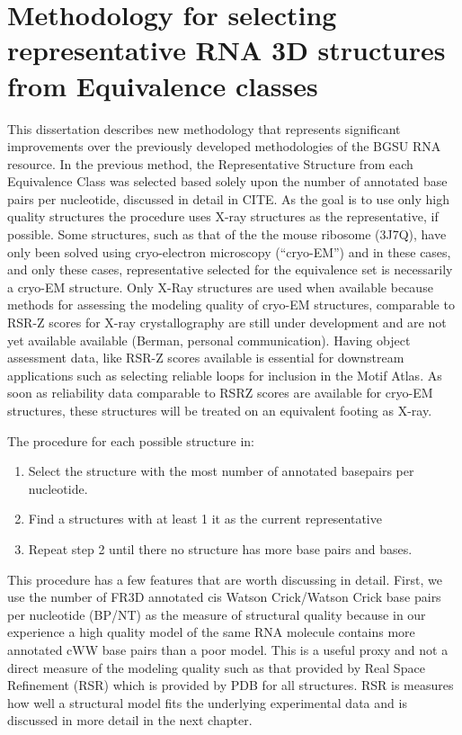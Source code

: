 \section{Methodology for selecting representative RNA 3D structures from
Equivalence classes}

This dissertation describes new methodology that represents significant
improvements over the previously developed methodologies of the BGSU RNA
resource. In the previous method, the Representative Structure from each
Equivalence Class was selected based solely upon the number of annotated base
pairs per nucleotide, discussed in detail in CITE. 
As the goal is to use only high quality structures the procedure uses X-ray
structures as the representative, if possible. Some structures, such as that of
the the mouse ribosome (3J7Q), have only been solved using cryo-electron
microscopy (“cryo-EM”) and in these cases, and only these cases, representative
selected for the equivalence set is necessarily a cryo-EM structure. Only X-Ray
structures are used when available because methods for assessing the modeling
quality of cryo-EM structures, comparable to RSR-Z scores for X-ray
crystallography are still under development and are not yet available available
(Berman, personal communication). Having object assessment data, like RSR-Z
scores available is essential for downstream applications such as selecting
reliable loops for inclusion in the Motif Atlas. As soon as reliability data
comparable to RSRZ scores are available for cryo-EM structures, these structures
will be treated on an equivalent footing as X-ray.

The procedure for each possible structure in:

\begin{enumerate}
  \item Select the structure with the most number of annotated basepairs per
    nucleotide.

  \item Find a structures with at least 1%
    it as the current representative

  \item Repeat step 2 until there no structure has more base pairs and bases.
\end{enumerate}

This procedure has a few features that are worth discussing in detail. First, we
use the number of FR3D annotated cis Watson Crick/Watson Crick base pairs per
nucleotide (BP/NT) as the measure of structural quality because in our
experience a high quality model of the same RNA molecule contains more annotated
cWW base pairs than a poor model. This is a useful proxy and not a direct
measure of the modeling quality such as that provided by Real Space Refinement
(RSR) which is provided by PDB for all structures. RSR is measures how well a
structural model fits the underlying experimental data and is discussed in more
detail in the next chapter.

